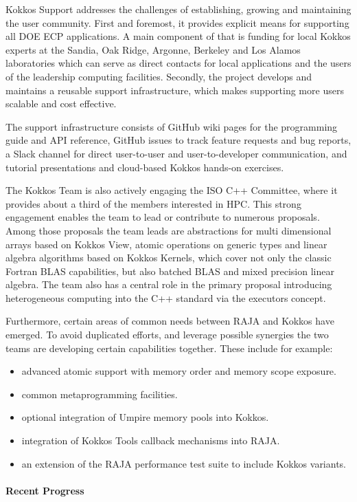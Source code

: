 Kokkos Support addresses the challenges of establishing, growing and maintaining the user community.
First and foremost, it provides explicit means for supporting all DOE ECP applications. 
A main component of that is funding for local Kokkos experts at the Sandia, Oak Ridge, Argonne, Berkeley and Los Alamos laboratories which can serve as direct contacts for local applications and the users of the leadership computing facilities. 
Secondly, the project develops and maintains a reusable support infrastructure, which makes supporting more users scalable and cost effective. 

The support infrastructure consists of GitHub wiki pages for the programming guide and API reference, GitHub issues to track feature requests and bug reports, a Slack channel for direct user-to-user and user-to-developer communication, and tutorial presentations and cloud-based Kokkos hands-on exercises. 

The Kokkos Team is also actively engaging the ISO C++ Committee, where it provides about a third of the members interested in HPC.
This strong engagement enables the team to lead or contribute to numerous proposals.
Among those proposals the team leads are abstractions for multi dimensional arrays based on Kokkos View, atomic operations on generic types and linear algebra algorithms based on Kokkos Kernels, which cover not only the classic Fortran BLAS capabilities, but also batched BLAS and mixed precision linear algebra.
The team also has a central role in the primary proposal introducing heterogeneous computing into the C++ standard via the executors concept.

Furthermore, certain areas of common needs between RAJA and Kokkos have emerged. 
To avoid duplicated efforts, and leverage possible synergies the two teams are developing certain capabilities together.
These include for example:
\begin{itemize}
 \item advanced atomic support with memory order and memory scope exposure.
 \item common metaprogramming facilities.
 \item optional integration of Umpire memory pools into Kokkos.
 \item integration of Kokkos Tools callback mechanisms into RAJA.
 \item an extension of the RAJA performance test suite to include Kokkos variants.
\end{itemize}

\paragraph{Recent Progress}

